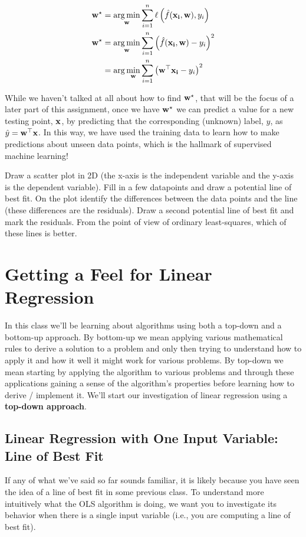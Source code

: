 \documentclass[assignment01_Solutions]{subfiles}
\begin{document}
\begin{align}
\mathbf{w}^\star &= \operatorname*{arg\,min}_{\mathbf{w}} \sum_{i=1}^n \ell \left ( \hat{f}(\mathbf{x_i}, \mathbf{w}) , y_i \right) \\
\mathbf{w}^\star &= \operatorname*{arg\,min}_{\mathbf{w}} \sum_{i=1}^n \left ( \hat{f}(\mathbf{x_i}, \mathbf{w}) - y_i \right)^2 \\
&= \arg\min_{\mathbf{w}} \sum_{i=1}^n \left ( \mathbf{w}^\top \mathbf{x_i} - y_i \right)^2
\end{align}

While we haven't talked at all about how to find $\mathbf{w}^\star$, that will be the focus of a later part of this assignment, once we have $\mathbf{w}^\star$ we can predict a value for a new testing point, $\mathbf{x}$, by predicting that the corresponding (unknown) label, $y$, as $\hat{y} = \mathbf{w}^\top \mathbf{x}$.  In this way, we have used the training data to learn how to make predictions about unseen data points, which is the hallmark of supervised machine learning!

\begin{exercise}
Draw a scatter plot in 2D (the x-axis is the independent variable and the y-axis is the dependent variable).  Fill in a few datapoints and draw a potential line of best fit.  On the plot identify the differences between the data points and the line (these differences are the residuals).  Draw a second potential line of best fit and mark the residuals.  From the point of view of ordinary least-squares, which of these lines is better.
\end{exercise}

\section{Getting a Feel for Linear Regression}
In this class we'll be learning about algorithms using both a top-down and a bottom-up approach.  By bottom-up we mean applying various mathematical rules to derive a solution to a problem and only then trying to understand how to apply it and how it well it might work for various problems.  By top-down we mean starting by applying the algorithm to various problems and through these applications gaining a sense of the algorithm's properties before learning how to derive / implement it.  We'll start our investigation of linear regression using a \textbf{top-down approach}.


\subsection{Linear Regression with One Input Variable: Line of Best Fit}
If any of what we've said so far sounds familiar, it is likely because you have seen the idea of a line of best fit in some previous class.  To understand more intuitively what the OLS algorithm is doing, we want you to investigate its behavior when there is a single input variable (i.e., you are computing a line of best fit).  
\end{document}
